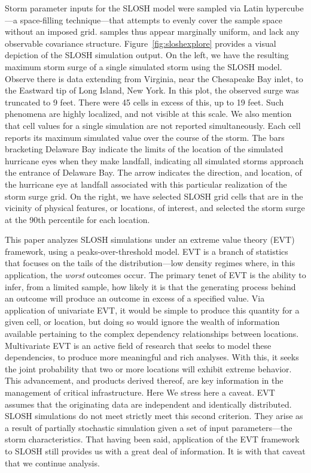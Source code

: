 Storm parameter inputs for the SLOSH model were sampled via Latin hypercube---a space-filling
    technique---that attempts to evenly cover the sample space without an imposed grid.
    samples thus appear marginally uniform, and lack any observable covariance structure.
    Figure~\ref{fig:sloshexplore} provides a visual depiction of the SLOSH simulation 
    output. On the left, we have the resulting maximum storm surge of a single
    simulated storm using the SLOSH model.  Observe there is data extending from
    Virginia, near the Chesapeake Bay inlet, to the Eastward tip of Long Island, New York.  
    In this plot, the observed  
    surge was truncated to 9 feet.  There were 45 cells in excess of this, up to 19 feet.
    Such phenomena are highly localized, and not visible at this scale.  We also mention
    that cell values for a single simulation are not reported simultaneously.  Each cell 
    reports its maximum simulated value over the course of the storm.
    The bars bracketing Delaware Bay indicate the limits of the location of the simulated
    hurricane eyes when they make landfall, indicating all simulated storms approach the
    entrance of Delaware Bay.  The arrow indicates the direction, and location, of the
    hurricane eye at landfall associated with this particular realization of the storm surge
    grid.  On the right, we have selected SLOSH grid cells that are in the
    vicinity of physical features, or locations, of interest, and selected the storm
    surge at the 90th percentile for each location.

This paper analyzes SLOSH simulations under an extreme value theory (EVT) framework,
    using a peaks-over-threshold model.  EVT is a branch of statistics that focuses
    on the tails of the distribution---low density regimes where, in this application,
    the \emph{worst} outcomes occur.  The primary tenet of EVT is the ability to infer,
    from a limited sample, how likely it is that the generating process behind an outcome
    will produce an outcome in excess of a specified value. Via application of univariate 
    EVT, it would be simple to produce this quantity for a given cell, or location, but 
    doing so would ignore the wealth of information available pertaining to the complex 
    dependency relationships between locations.  Multivariate EVT is an active 
    field of research that seeks to model these dependencies, to produce more meaningful
    and rich analyses.  With this, it seeks the joint probability that two or more locations
    will exhibit extreme behavior.  This advancement, and products derived thereof,
    are key information in the management of critical infrastructure.
    Here We stress here a caveat. EVT assumes that the originating data are independent
    and identically distributed.  SLOSH simulations do not meet strictly meet this 
    second criterion.  They arise as a result of partially stochastic simulation 
    given a set of input parameters---the storm characteristics. That
    having been said, application of the EVT framework to SLOSH still provides us
    with a great deal of information.  It is with that caveat that we continue analysis.

